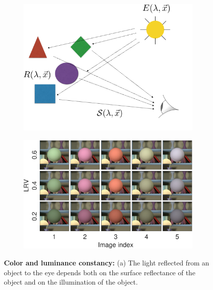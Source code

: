\documentclass{jov}
\begin{document}
\begin{figure}
\centering
\begin{subfigure}{0.4 \textwidth}
	\centering
	\caption{}
        \includegraphics[width=\textwidth]{../FiguresDraft5/Figure1/Figure1_a.png}
        \label{fig:introSchematic}
    \end{subfigure}
    \begin{subfigure}{0.55 \textwidth}   
        \caption{}    
        \includegraphics[width=\textwidth]{../FiguresDraft5/Figure1/Figure1_b.pdf}
        \label{fig:introExampleFigure}
    \end{subfigure}
    \label{introFigure}
    \caption{{\bf Color and luminance constancy:} (a)  The light reflected from an object to the eye depends both on the surface reflectance of the object and on the illumination of the object. 
}
\end{figure}
\end{document}
